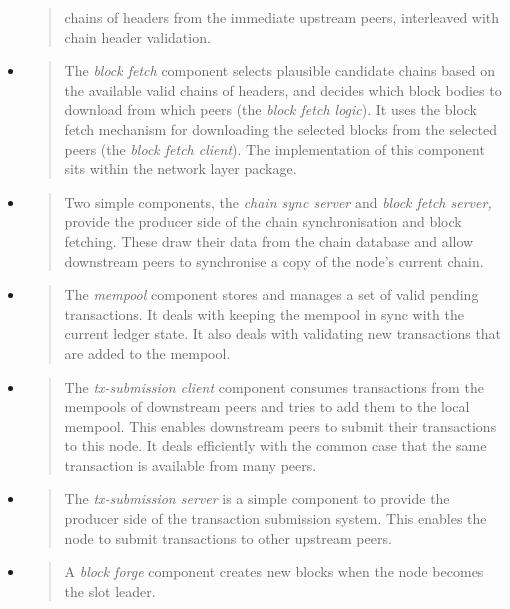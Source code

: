 \documentclass[]{article}
\begin{document}
\begin{itemize}
\begin{quote}
  chains of headers from the immediate upstream peers, interleaved with
  chain header validation.
  \end{quote}
\item
  \begin{quote}
  The \emph{block fetch} component selects plausible candidate chains
  based on the available valid chains of headers, and decides which
  block bodies to download from which peers (the \emph{block fetch
  logic}). It uses the block fetch mechanism for downloading the
  selected blocks from the selected peers (the \emph{block fetch
  client}). The implementation of this component sits within the network
  layer package.
  \end{quote}
\item
  \begin{quote}
  Two simple components, the \emph{chain sync server} and \emph{block
  fetch server,} provide the producer side of the chain synchronisation
  and block fetching. These draw their data from the chain database and
  allow downstream peers to synchronise a copy of the node's current
  chain.
  \end{quote}
\item
  \begin{quote}
  The \emph{mempool} component stores and manages a set of valid pending
  transactions. It deals with keeping the mempool in sync with the
  current ledger state. It also deals with validating new transactions
  that are added to the mempool.
  \end{quote}
\item
  \begin{quote}
  The \emph{tx-submission client} component consumes transactions from
  the mempools of downstream peers and tries to add them to the local
  mempool. This enables downstream peers to submit their transactions to
  this node. It deals efficiently with the common case that the same
  transaction is available from many peers.
  \end{quote}
\item
  \begin{quote}
  The \emph{tx-submission server} is a simple component to provide the
  producer side of the transaction submission system. This enables the
  node to submit transactions to other upstream peers.
  \end{quote}
\item
  \begin{quote}
  A \emph{block forge} component creates new blocks when the node
  becomes the slot leader.
  \end{quote}
\end{itemize}
\end{document}

